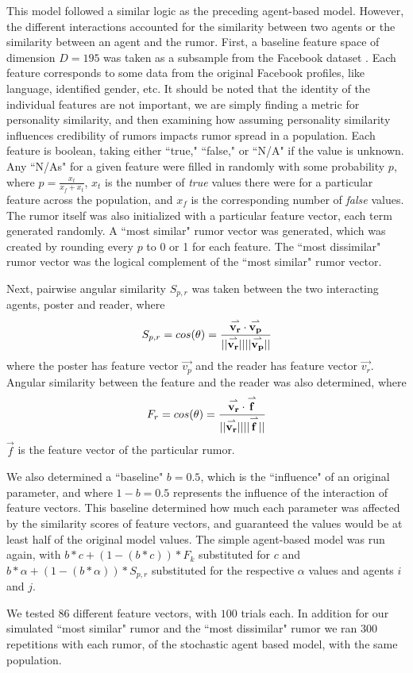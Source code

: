 This model followed a similar logic as the preceding agent-based model. However, the different interactions accounted for the similarity between two agents or the similarity between an agent and the rumor. First, a baseline feature space of dimension $ D = 195 $ was taken as a subsample from the Facebook dataset \cite{mcauley-2014}. Each feature corresponds to some data from the original Facebook profiles, like language, identified gender, etc. It should be noted that the identity of the individual features are not important, we are simply finding a metric for personality similarity, and then examining how assuming personality similarity influences credibility of rumors impacts rumor spread in a population. Each feature is boolean, taking either ``true," ``false," or ``N/A" if the value is unknown. Any ``N/As" for a given feature were filled in randomly with some probability $ p $, where $ p = \frac{x_{t}}{x_{f} + x_{t}} $, $ x_{t} $ is the number of \textit{true} values there were for a particular feature across the population, and $ x_{f} $ is the corresponding number of \textit{false} values. The rumor itself was also initialized with a particular feature vector, each term generated randomly. A ``most similar" rumor vector was generated, which was created by rounding every $ p $ to 0 or 1 for each feature. The ``most dissimilar" rumor vector was the logical complement of the ``most similar" rumor vector.

Next, pairwise angular similarity $ S_{p,r} $ was taken between the two interacting agents, poster and reader, where
$$ S_{p,r} = cos(\theta) = \frac{\overset{\rightharpoonup}{\mathbf{v_r}}\cdot\overset{\rightharpoonup}{\mathbf{v_p}}}{\lvert\lvert \overset{\rightharpoonup}{\mathbf{v_r}} \rvert\rvert \lvert\lvert \overset{\rightharpoonup}{\mathbf{v_p}} \rvert\rvert} $$ where the poster has feature vector $ \vec{v_p} $ and the reader has feature vector $ \vec{v_r} $. Angular similarity between the feature and the reader was also determined, where $$ F_r  = cos(\theta) = \frac{\overset{\rightharpoonup}{\mathbf{v_r}}\cdot\overset{\rightharpoonup}{\mathbf{f}}}{\lvert\lvert \overset{\rightharpoonup}{\mathbf{v_r}} \rvert\rvert \lvert\lvert \overset{\rightharpoonup}{\mathbf{f}} \rvert\rvert} $$ $ \vec{f} $ is the feature vector of the particular rumor.

We also determined a ``baseline" $ b = 0.5 $, which is the ``influence" of an original parameter, and where $ 1 - b = 0.5 $ represents the influence of the interaction of feature vectors. This baseline determined how much each parameter was affected by the similarity scores of feature vectors, and guaranteed the values would be at least half of the original model values. The simple agent-based model was run again, with $ b*c + (1-(b*c))*F_k $ substituted for $ c $ and $ b*\alpha + (1-(b*\alpha))*S_{p,r} $ substituted for the respective $ \alpha $ values and agents $ i $ and $ j $.

We tested $ 86 $ different feature vectors, with $ 100 $ trials each. In addition for our simulated ``most similar" rumor and the ``most dissimilar" rumor  we ran $ 300 $ repetitions with each rumor, of the stochastic agent based model, with the same population.
